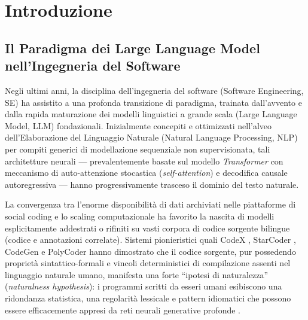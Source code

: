 \chapter{Introduzione}
\label{chap:introduzione}

\section{Il Paradigma dei Large Language Model nell'Ingegneria del Software}
\label{sec:intro_paradigma_llm}

Negli ultimi anni, la disciplina dell'ingegneria del software (Software Engineering, SE) ha assistito a una profonda transizione di paradigma, trainata dall'avvento e dalla rapida maturazione dei modelli linguistici a grande scala (Large Language Model, LLM) fondazionali. Inizialmente concepiti e ottimizzati nell'alveo dell'Elaborazione del Linguaggio Naturale (Natural Language Processing, NLP) per compiti generici di modellazione sequenziale non supervisionata, tali architetture neurali --- prevalentemente basate sul modello \emph{Transformer} con meccanismo di auto-attenzione stocastica (\emph{self-attention}) e decodifica causale autoregressiva --- hanno progressivamente trasceso il dominio del testo naturale.

La convergenza tra l'enorme disponibilità di dati archiviati nelle piattaforme di social coding e lo scaling computazionale ha favorito la nascita di modelli esplicitamente addestrati o rifiniti su vasti corpora di codice sorgente bilingue (codice e annotazioni correlate). Sistemi pionieristici quali CodeX \cite{khan_automatic_2023,ahmed_few-shot_2022}, StarCoder \cite{xu_prompt_2024,cordeiro_empirical_2024}, CodeGen \cite{nijkamp_codegen_2023} e PolyCoder \cite{xu_systematic_2022} hanno dimostrato che il codice sorgente, pur possedendo proprietà sintattico-formali e vincoli deterministici di compilazione assenti nel linguaggio naturale umano, manifesta una forte ``ipotesi di naturalezza'' (\emph{naturalness hypothesis}): i programmi scritti da esseri umani esibiscono una ridondanza statistica, una regolarità lessicale e pattern idiomatici che possono essere efficacemente appresi da reti neurali generative profonde \cite{feng_codebert_2020,guo_graphcodebert_2021}.


